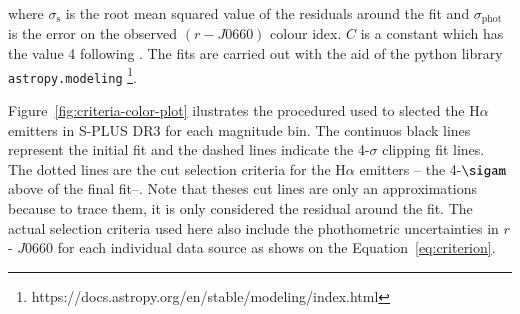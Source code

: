 \documentclass[fleqn,usenatbib]{mnras}
\begin{document}
 where $\sigma_{\mathrm{s}}$ is the root mean squared value of the residuals around
 the fit and $\sigma_{\mathrm{phot}}$ is the error on the observed $(r - J0660)$ colour idex.
 $C$ is a constant which has the value 4 following \citet{Wevers:2017}.
The fits are carried out with the aid of the python library \texttt{astropy.modeling}
\footnote{https://docs.astropy.org/en/stable/modeling/index.html}.

Figure~\ref{fig:criteria-color-plot} ilustrates the procedured used to slected the H{$\alpha$}
emitters in S-PLUS DR3 for each magnitude bin. The continuos black lines represent the initial
fit and  the dashed lines indicate the 4-$\sigma$ clipping fit lines. The dotted lines are
the cut selection criteria for the H{$\alpha$} emitters -- the 4-$\sigam$ above of the final
fit--. Note that theses cut lines are only an approximations because to trace them,
it is only considered the residual around the fit. The actual selection criteria used here
also include the phothometric uncertainties in $r$ - $J$0660 for each individual data source as
shows on the Equation~\ref{eq:criterion}.
\end{document}
